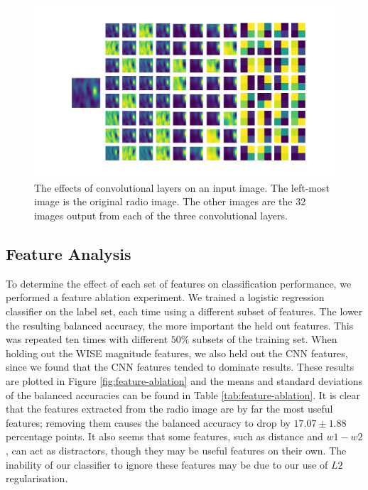       \begin{figure}
        \centering
        \includegraphics[width=\textwidth]{images/rgz_cnn}
        \caption{The effects of convolutional layers on an input image. The
          left-most image is the original radio image. The other images are the
          32 images output from each of the three convolutional layers.}
        \label{fig:rgz-cnn}
      \end{figure}

  \subsection{Feature Analysis}
  \label{sec:feature-analysis}

    To determine the effect of each set of features on classification
    performance, we performed a feature ablation experiment. We trained a
    logistic regression classifier on the \citeauthor{norris06} label set, each
    time using a different subset of features. The lower the resulting balanced
    accuracy, the more important the held out features. This was repeated ten
    times with different $50\%$ subsets of the training set. When holding out
    the WISE magnitude features, we also held out the CNN features, since we
    found that the CNN features tended to dominate results. These results are
    plotted in Figure \ref{fig:feature-ablation} and the means and standard
    deviations of the balanced accuracies can be found in Table
    \ref{tab:feature-ablation}. It is clear that the features extracted from the
    radio image are by far the most useful features; removing them causes the
    balanced accuracy to drop by $17.07 \pm 1.88$ percentage points. It also
    seems that some features, such as distance and $w1 - w2$, can act as
    distractors, though they may be useful features on their own. The inability
    of our classifier to ignore these features may be due to our use of $L2$
    regularisation.

